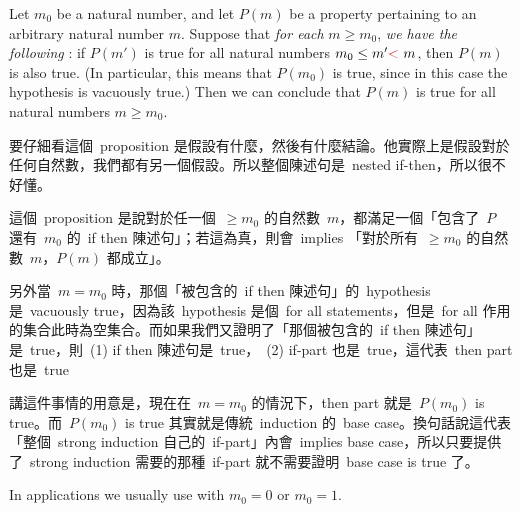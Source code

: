 \begin{proposition} \label{prop 2.2.14}
Let \(m_0\) be a natural number, and let \(P(m)\) be a property pertaining to an arbitrary natural number \(m\). Suppose that \emph{for each} \(m \geq m_0\), \emph{we have the following } : if \(P(m')\) is true for all natural numbers \(m_0 \leq m' \RED{<}\ m\), then \(P(m)\) is also true. (In particular, this means that \(P(m_0)\) is true, since in this case the hypothesis is vacuously true.) Then we can conclude that \(P(m)\) is true for all natural numbers \(m \geq m_0\).
\end{proposition}
\begin{note}
要仔細看這個\ proposition 是假設有什麼，然後有什麼結論。他實際上是假設對於任何自然數，我們都有另一個假設。所以整個陳述句是\ nested if-then，所以很不好懂。

這個\ proposition 是說對於任一個\ \(\geq m_0\) 的自然數\ \(m\)，都滿足一個「包含了\ \(P\) 還有\ \(m_0\) 的\ if then 陳述句」；若這為真，則會\ implies 「對於所有\ \(\geq m_0\) 的自然數\ 
\(m\)，\(P(m)\) 都成立」。

另外當\ \(m = m_0\) 時，那個「被包含的\ if then 陳述句」的\ hypothesis 是\ vacuously true，因為該\ hypothesis 是個\ for all statements，但是\ for all 作用的集合此時為空集合。而如果我們又證明了「那個被包含的\ if then 陳述句」是\ true，則\ (1) if then 陳述句是\ true，\ (2) if-part 也是\ true，這代表\ then part 也是\ true

講這件事情的用意是，現在在\ \(m = m_0\) 的情況下，then part 就是\ \(P(m_0)\) is true。而\ \(P(m_0)\) is true 其實就是傳統\ induction 的\ base case。換句話說這代表「整個\ strong induction 自己的\ if-part」內會\ implies base case，所以只要提供了\ strong induction 需要的那種\ if-part 就不需要證明\ base case is true 了。
\end{note}

\begin{remark}\label{remark 2.2.15}
In applications we usually use  with \(m_0 = 0\) or \(m_0 = 1\).
\end{remark}

